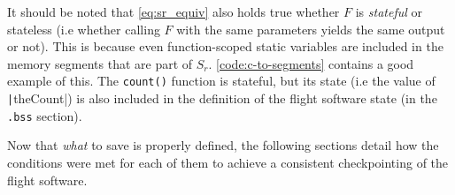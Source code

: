 {It should be noted that \autoref{eq:sr_equiv} also holds true whether $F$ is \textit{stateful} or stateless (i.e whether calling $F$ with the same parameters yields the same output or not). This is because even function-scoped static variables are included in the memory segments that are part of $S_r$. \autoref{code:c-to-segments} contains a good example of this. The \texttt{count()} function is stateful, but its state (i.e the value of \texttt|theCount|) is also included in the definition of the flight software state (in the \texttt{.bss} section).

Now that \textit{what} to save is properly defined, the following sections detail how the conditions were met for each of them to achieve a consistent checkpointing of the flight software.




}